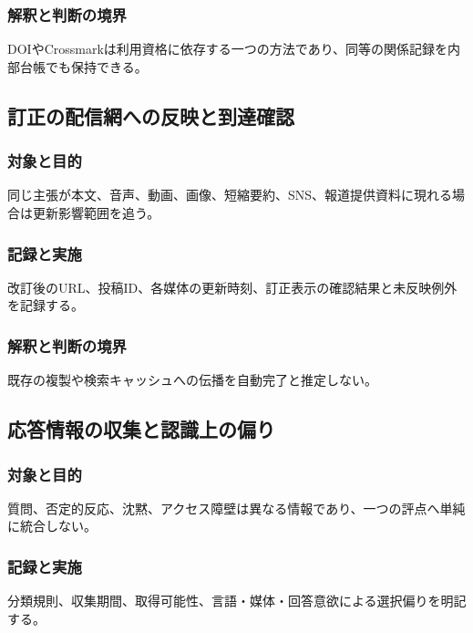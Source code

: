 \documentclass[a4paper,11pt]{article}
\begin{document}
\subsubsection{解釈と判断の境界}
\par DOIやCrossmarkは利用資格に依存する一つの方法であり、同等の関係記録を内部台帳でも保持できる。\par\medskip
\subsection{訂正の配信網への反映と到達確認}
\subsubsection{対象と目的}
\par 同じ主張が本文、音声、動画、画像、短縮要約、SNS、報道提供資料に現れる場合は更新影響範囲を追う。\par\medskip
\subsubsection{記録と実施}
\par 改訂後のURL、投稿ID、各媒体の更新時刻、訂正表示の確認結果と未反映例外を記録する。\par\medskip
\subsubsection{解釈と判断の境界}
\par 既存の複製や検索キャッシュへの伝播を自動完了と推定しない。\par\medskip
\subsection{応答情報の収集と認識上の偏り}
\subsubsection{対象と目的}
\par 質問、否定的反応、沈黙、アクセス障壁は異なる情報であり、一つの評点へ単純に統合しない。\par\medskip
\subsubsection{記録と実施}
\par 分類規則、収集期間、取得可能性、言語・媒体・回答意欲による選択偏りを明記する。\par\medskip
\end{document}
